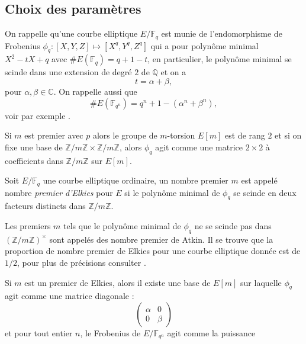 \documentclass[a4paper]{article} %
\numberwithin{section}{part}
\numberwithin{equation}{section}
\newcommand\zmodn[1]{\mathbb{Z}/#1\mathbb{Z}}
\newcommand\zmodninv[1]{(\mathbb{Z}/#1\mathbb{Z})^{\times}}
\newcommand\GF[1]{\mathbb{F}_{#1}}
\newcommand\QQ{\mathbb{Q}}
\newcommand\CC{\mathbb{C}}
\begin{document}
\subsection{Choix des paramètres}
\label{sec:choixparam}
On rappelle qu'une courbe elliptique $E/\GF{q}$ est munie de l'endomorphisme de
Frobenius $\phi_q : [X, Y, Z] \mapsto [X^q, Y^q, Z^q]$ qui a pour polynôme
minimal $X^2 -tX + q$ avec $\#E(\GF{q}) = q + 1 - t$, en particulier, le
polynôme minimal se scinde dans une extension de degré $2$ de $\QQ$ et on a 
\begin{equation}
t = \alpha + \beta, 
\end{equation}
pour $\alpha,\beta\in\CC$. On rappelle aussi que 
\begin{equation}
\#E(\GF{q^n}) = q^n + 1 - (\alpha^n + \beta^n), 
\end{equation}
voir par exemple \cite[th. 2.3.1, chap V]{Sil}.\par
Si $m$ est premier avec $p$ alors le groupe de $m$-torsion $E[m]$ est de rang
$2$ et si on fixe une base de $\zmodn{m}\times\zmodn{m}$, alors $\phi_q$ 
agit comme une matrice $2\times2$ à coefficients dans $\zmodn{m}$ sur $E[m]$.
\begin{defn}
Soit $E/\GF{q}$ une courbe elliptique ordinaire, un nombre premier $m$ est 
appelé nombre \emph{premier d'Elkies} pour $E$ si le polynôme minimal de 
$\phi_q$ se scinde en deux facteurs distincts dans $\zmodn{m}$.
\end{defn}
\begin{rem}
Les premiers $m$ tels que le polynôme minimal de $\phi_q$ ne se scinde pas
dans $\zmodninv{m}$ sont appelés des nombre premier de Atkin. Il se trouve que
la proportion de nombre premier de Elkies pour une courbe elliptique donnée est
de $1/2$, pour plus de précisions consulter \cite{Scho}.
\end{rem}
Si $m$ est un premier de Elkies, alors il existe une base de $E[m]$ sur 
laquelle $\phi_q$ agit comme une matrice diagonale :
\begin{equation}
\begin{pmatrix}
\alpha & 0\\
0 & \beta
\end{pmatrix}
\end{equation}
et pour tout entier $n$, le Frobenius de $E/\GF{q^n}$ agit comme la puissance
\end{document}
